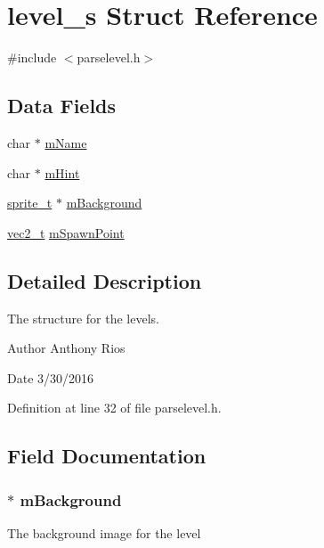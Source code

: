 \hypertarget{structlevel__s}{}\section{level\+\_\+s Struct Reference}
\label{structlevel__s}


{\ttfamily \#include $<$parselevel.\+h$>$}

\subsection*{Data Fields}
\begin{DoxyCompactItemize}
\item 
char $\ast$ \hyperlink{structlevel__s_ad5201d7f075979ee60c684961d6a4ead}{m\+Name}
\item 
char $\ast$ \hyperlink{structlevel__s_a3353a10b7f238b4dc36fc1ccad58cd45}{m\+Hint}
\item 
\hyperlink{graphics_8h_a5371414b10358aeda7c6bcec8196342f}{sprite\+\_\+t} $\ast$ \hyperlink{structlevel__s_ab2cdfd66047e062b1da2948d07f9f90d}{m\+Background}
\item 
\hyperlink{globals_8h_a773f2054819bb6014f1e50baa39cb5e3}{vec2\+\_\+t} \hyperlink{structlevel__s_aa7fb9f569bb3df8b37853ebc7e67b11c}{m\+Spawn\+Point}
\end{DoxyCompactItemize}


\subsection{Detailed Description}
The structure for the levels.

\begin{DoxyAuthor}{Author}
Anthony Rios 
\end{DoxyAuthor}
\begin{DoxyDate}{Date}
3/30/2016 
\end{DoxyDate}


Definition at line 32 of file parselevel.\+h.



\subsection{Field Documentation}
\subsubsection[{\texorpdfstring{m\+Background}{mBackground}}]{$\ast$ m\+Background}\hypertarget{structlevel__s_ab2cdfd66047e062b1da2948d07f9f90d}{}\label{structlevel__s_ab2cdfd66047e062b1da2948d07f9f90d}
The background image for the level 

